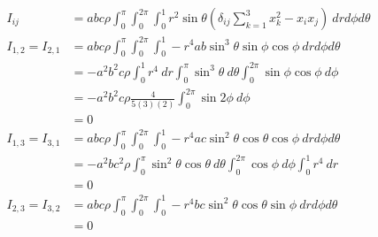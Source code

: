 \documentclass[12pt]{article}
\newenvironment{problem}[2][Problem]{\begin{trivlist}
\item[\hskip \labelsep {\bfseries #1}\hskip \labelsep {\bfseries #2.}]}{\end{trivlist}}
\begin{document}
\begin{problem}{2.c}
\end{problem}
\begin{align*}
	I_{ij} &= abc \rho \int_0^\pi \int_0^{2\pi} \int_0^1 
		r^2 \sin\theta 
		\left( 
			\delta_{ij} \sum_{k=1}^3 x_k^2 - x_ix_j
		\right)
	\ dr d\phi d\theta \\
	I_{1,2} = I_{2,1} &= 
	abc \rho \int_0^\pi \int_0^{2\pi} \int_0^1 
		-r^4 ab \sin^3\theta\sin\phi\cos\phi 
	\ dr d\phi d\theta \\
	&= -a^2b^2c \rho 
	\int_0^1 
		r^4 
	\ dr 
	\int_0^\pi 
		\sin^3\theta
	\ d\theta 
	\int_0^{2\pi} 
		\sin\phi\cos\phi 
	\ d\phi \\
	&= -a^2b^2c \rho \frac{4}{5(3)(2)}
	\int_0^{2\pi} 
		\sin2\phi
	\ d\phi \\
	&= 0 \\
	I_{1,3} = I_{3,1} &= 
	abc \rho \int_0^\pi \int_0^{2\pi} \int_0^1 
		-r^4 ac \sin^2\theta\cos\theta\cos\phi 
	\ dr d\phi d\theta \\
	&= -a^2bc^2 \rho 
	\int_0^\pi 
		\sin^2\theta\cos\theta
	\ d\theta 
	\int_0^{2\pi} 
		\cos\phi 
	\ d\phi 
	\int_0^1 
		r^4 
	\ dr \\
	&= 0 \\
	I_{2,3} = I_{3,2} &= 
	abc \rho \int_0^\pi \int_0^{2\pi} \int_0^1 
		-r^4 bc \sin^2\theta\cos\theta\sin\phi 
	\ dr d\phi d\theta \\
	&= 0 \\
\end{align*}
\filbreak
\end{document}
